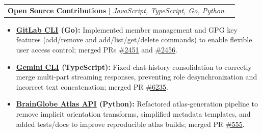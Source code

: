 \documentclass[letterpaper,11pt]{article}
\makeatletter
\newcommand{\resumeItem}[1]{
  \item\small{
    {#1 \vspace{-2pt}}
  }
}
\newcommand{\resumeProjectHeading}[2]{
    \item
    \begin{tabular*}{\textwidth}{l@{\extracolsep{\fill}}r}
      \small#1 & #2 \\
    \end{tabular*}\vspace{-7pt}
}
\newcommand{\resumeItemListStart}{\begin{itemize}[leftmargin=0.15in]}
\newcommand{\resumeItemListEnd}{\end{itemize}\vspace{-5pt}}
\makeatother
\begin{document}
\resumeProjectHeading
{\textbf{Open Source Contributions} $|$ \emph{JavaScript, TypeScript, Go, Python}}{}
\resumeItemListStart
\resumeItem{\textbf{\href{https://gitlab.com/gitlab-org/cli}{GitLab CLI} (Go):} Implemented member management and GPG key features (add/remove and add/list/get/delete commands) to enable flexible user access control; merged PRs \href{https://gitlab.com/gitlab-org/cli/-/merge_requests/2451}{\#2451} and \href{https://gitlab.com/gitlab-org/cli/-/merge_requests/2456}{\#2456}.}
\resumeItem{\textbf{\href{https://github.com/google-gemini/gemini-cli}{Gemini CLI} (TypeScript):} Fixed chat-history consolidation to correctly merge multi-part streaming responses, preventing role desynchronization and incorrect text concatenation; merged PR \href{https://github.com/google-gemini/gemini-cli/pull/6235}{\#6235}.}
\resumeItem{\textbf{\href{https://github.com/brainglobe/brainglobe-atlasapi}{BrainGlobe Atlas API} (Python):} Refactored atlas-generation pipeline to remove implicit orientation transforms, simplified metadata templates, and added tests/docs to improve reproducible atlas builds; merged PR \href{https://github.com/brainglobe/brainglobe-atlasapi/pull/555}{\#555}.}
\resumeItemListEnd
\end{document}

